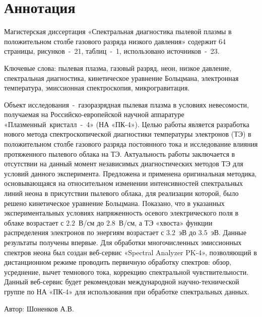 \chapter*{Аннотация}

Магистерская диссертация «Спектральная диагностика пылевой плазмы в положительном столбе газового разряда низкого давления»
содержит 64 страницы, рисунков~-~21, таблиц~-~1, использовано источников~-~23.

Ключевые слова: пылевая плазма, газовый разряд, неон, низкое давление, спектральная диагностика,
кинетическое уравнение Больцмана, электронная температура, эмиссионная спектроскопия, микрогравитация.

Объект исследования~-~газоразрядная пылевая плазма в условиях невесомости,
получаемая на Российско-европейской научной аппаратуре «Плазменный~кристалл~-~4» (НА «ПК-4»).
Целью работы является разработка нового метода спектроскопической диагностики температуры электронов (ТЭ) в
положительном столбе газового разряда постоянного тока и исследование влияния
протяженного пылевого облака на ТЭ. Актуальность работы
заключается в отсутствии на данный момент независимых диагностических методов
ТЭ для условий данного эксперимента.
Предложена и применена оригинальная методика, основывающаяся на
относительном изменении интенсивностей спектральных линий неона в
присутствии пылевого облака, для реализации которой, было решено
кинетическое уравнение Больцмана. Показано, что в указанных
экспериментальных условиях напряженность осевого электрического поля в облаке
возрастает с $2.2$~В/см до $2.8$~В/см, а ТЭ «хвоста» функции распределения
электронов по энергиям возрастает с $3.2$~эВ до $3.5$~эВ. Данные результаты
получены впервые. Для обработки многочисленных эмиссионных спектров неона
был создан веб-сервис «Spectral Analyzer PK-4», позволяющий в дистанционном
режиме проводить первичную обработку спектров: обзор, усреднение, вычет
темнового тока, коррекцию спектральной чувствительности. Данный
веб-сервис будет рекомендован международной научно-технической группе по НА
«ПК-4» для использования при обработке спектральных данных.

\vfill
\vfill
\begin{minipage}{.49\textwidth}\end{minipage}
\hfill
\begin{minipage}{.49\textwidth}
    Автор: \uline{\hfill} Шоненков А.В.
\end{minipage}
\vfill
